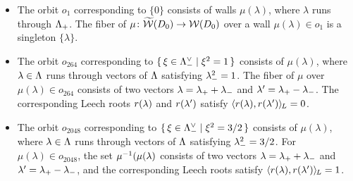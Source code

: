 \documentclass{amsart} %
\begin{document}
\begin{itemize}
\item[($1$)]
The orbit $o_1$ corresponding to $\{0\}$
consists of walls $\mu(\lambda)$,
where $\lambda$ runs through $\Lambda_{+}$.
The  fiber of  $\mu\colon \widetilde{\mathord{\mathcal{W}}}(D_0)\to\mathord{\mathcal{W}}(D_0)$ 
over a wall $\mu(\lambda)\in o_1$  is a  singleton $\{\lambda\}$.
%
\item[($264$)]
The orbit $o_{264}$ corresponding to $\{\,{\xi\in \Lambda_{-}^{\vee}}\mid {\xi^2=1} \,\}$
consists of $\mu(\lambda)$,
where $\lambda\in \Lambda$ runs through
vectors of  $\Lambda$  satisfying ${\lambda}_{-}^2=1$.
The fiber of $\mu$ 
over $\mu(\lambda)\in o_{264}$ consists 
of two vectors
$\lambda={\lambda}_{+}+{\lambda}_{-}$ and $\lambda^{\prime}={\lambda}_{+}-{\lambda}_{-}$.
The corresponding Leech roots 
$r(\lambda)$ and $r(\lambda^{\prime})$  satisfy
$\langle r(\lambda), r(\lambda^{\prime}) \rangle_{\hskip -1pt L}=0$.
%
\item[($2048$)]
The orbit $o_{2048}$ corresponding to $\{\,{\xi\in \Lambda_{-}^{\vee}}\mid {\xi^2=3/2} \,\}$
consists of $\mu(\lambda)$,
where $\lambda\in \Lambda$ runs through
vectors of  $\Lambda$  satisfying ${\lambda}_{-}^2=3/2$.
For $\mu(\lambda)\in o_{2048}$, the set
 $\mu^{-1}(\mu(\lambda)$ consists 
of two vectors
$\lambda={\lambda}_{+}+{\lambda}_{-}$ and $\lambda^{\prime}={\lambda}_{+}-{\lambda}_{-}$, and 
the corresponding Leech roots 
 satisfy
$\langle r(\lambda), r(\lambda^{\prime}) \rangle_{\hskip -1pt L}=1$.

\end{itemize}
%
\end{document}
